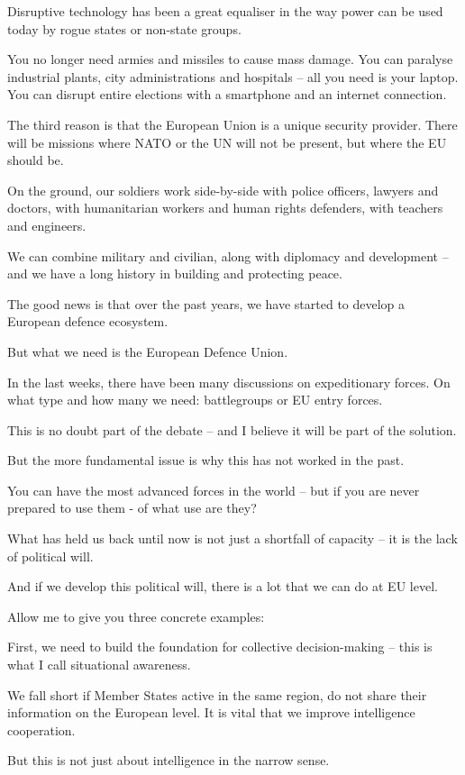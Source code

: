 \documentclass[a4paper,11pt]{article}
\begin{document}
Disruptive technology has been a great equaliser in the way power can be used today by rogue states or non-state groups. 

You no longer need armies and missiles to cause mass damage. You can paralyse industrial plants, city administrations and hospitals – all you need is your laptop.  You can disrupt entire elections with a smartphone and an internet connection.

The third reason is that the European Union is a unique security provider. There will be missions where NATO or the UN will not be present, but where the EU should be.

On the ground, our soldiers work side-by-side with police officers, lawyers and doctors, with humanitarian workers and human rights defenders, with teachers and engineers.

We can combine military and civilian, along with diplomacy and development – and we have a long history in building and protecting peace.

The good news is that over the past years, we have started to develop a European defence ecosystem.

But what we need is the European Defence Union.

In the last weeks, there have been many discussions on expeditionary forces. On what type and how many we need: battlegroups or EU entry forces.

This is no doubt part of the debate – and I believe it will be part of the solution.

But the more fundamental issue is why this has not worked in the past.

You can have the most advanced forces in the world – but if you are never prepared to use them - of what use are they? 

What has held us back until now is not just a shortfall of capacity – it is the lack of political will.

And if we develop this political will, there is a lot that we can do at EU level.

Allow me to give you three concrete examples:

First, we need to build the foundation for collective decision-making – this is what I call situational awareness.

We fall short if Member States active in the same region, do not share their information on the European level. It is vital that we improve intelligence cooperation.

But this is not just about intelligence in the narrow sense.
\end{document}
